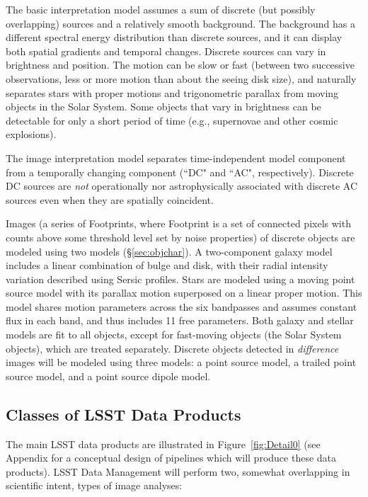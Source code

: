 \documentclass[12pt]{article}
\begin{document}
The basic interpretation model assumes a sum of discrete (but possibly overlapping)
sources and a relatively smooth background. The background has a different
spectral energy distribution than discrete sources, and it can display both
spatial gradients and temporal changes. Discrete sources can vary
in brightness and position. The motion can be slow or fast (between two successive observations,
less or more motion than about the seeing disk size), and naturally separates stars
with proper motions and trigonometric parallax from moving objects in the Solar System.
Some objects that vary in brightness can be detectable for only a short period of time
(e.g., supernovae and other cosmic explosions).

The image interpretation model separates time-independent model
component from a temporally changing component (``DC" and ``AC",
respectively). Discrete DC sources are {\it not} operationally nor astrophysically
associated with discrete AC sources even when they are spatially coincident.

Images (a series of Footprints, where Footprint is a set of connected pixels with
counts above some threshold level set by noise properties) of discrete objects are
modeled using two models (\S\ref{sec:objchar}). A two-component galaxy model includes a linear
combination of bulge and disk, with their radial intensity variation described using
Sersic profiles.
Stars are modeled using a moving point source model with its parallax motion
superposed on a linear proper motion. This model shares motion parameters across
the six bandpasses and assumes constant flux in each band, and thus includes
11 free parameters. Both galaxy and stellar models are fit to all objects, except
for fast-moving objects (the Solar System objects), which are treated separately.
Discrete objects detected in {\em difference} images will be modeled using three models:
a point source model, a trailed point source model, and a point source dipole model.

\subsection{Classes of LSST Data Products}

The main LSST data products are illustrated in Figure~\ref{fig:Detail0} (see Appendix for
a conceptual design of pipelines which will produce these data products).
LSST Data Management will perform two, somewhat overlapping in scientific intent, types of image analyses:
\end{document}

